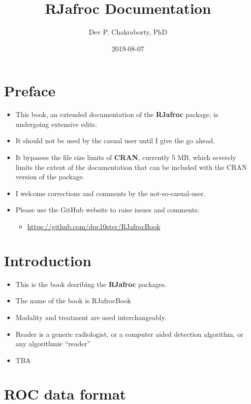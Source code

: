 \documentclass[]{book}
\title{RJafroc Documentation}
\author{Dev P. Chakraborty, PhD}
\date{2019-08-07}
\providecommand{\tightlist}{%
  \setlength{\itemsep}{0pt}\setlength{\parskip}{0pt}}
\begin{document}
\maketitle

{
\setcounter{tocdepth}{1}
\tableofcontents
}
\hypertarget{preface}{%
\chapter{Preface}\label{preface}}

\begin{itemize}
\tightlist
\item
  This book, an extended documentation of the \textbf{RJafroc} package, is undergoing extensive edits.
\item
  It should not be used by the casual user until I give the go ahead.
\item
  It bypasses the file size limits of \textbf{CRAN}, currently 5 MB, which severely limits the extent of the documentation that can be included with the CRAN version of the package.
\item
  I welcome corrections and comments by the not-so-casual-user.
\item
  Please use the GitHub website to raise issues and comments:

  \begin{itemize}
  \tightlist
  \item
    \url{https://github.com/dpc10ster/RJafrocBook}
  \end{itemize}
\end{itemize}

\hypertarget{intro}{%
\chapter{Introduction}\label{intro}}

\begin{itemize}
\tightlist
\item
  This is the book desribing the \textbf{RJafroc} packages.
\item
  The name of the book is RJafrocBook
\item
  Modality and treatment are used interchangeably.
\item
  Reader is a generic radiologist, or a computer aided detection algorithm, or any algorithmic ``reader''
\item
  TBA
\end{itemize}

\hypertarget{rocdataformat}{%
\chapter{ROC data format}\label{rocdataformat}}
\end{document}
